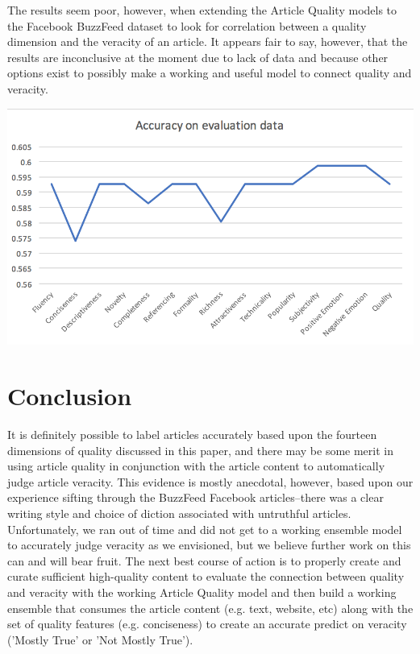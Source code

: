 \documentclass[11pt]{article}
\begin{document}
The results seem poor, however, when extending the Article Quality models to the Facebook BuzzFeed dataset to look for correlation between a quality dimension and the veracity of an article.  It appears fair to say, however, that the results are inconclusive at the moment due to lack of data and because other options exist to possibly make a working and useful model to connect quality and veracity.
\begin{center}
	\includegraphics[scale=0.5]{Results.png}
\end{center}

\section{Conclusion}

\indent \indent It is definitely possible to label articles accurately based upon the fourteen dimensions of quality discussed in this paper, and there may be some merit in using article quality in conjunction with the article content to automatically judge article veracity.  This evidence is mostly anecdotal, however, based upon our experience sifting through the BuzzFeed Facebook articles--there was a clear writing style and choice of diction associated with untruthful articles.\\
\indent Unfortunately, we ran out of time and did not get to a working ensemble model to accurately judge veracity as we envisioned, but we believe further work on this can and will bear fruit.  The next best course of action is to properly create and curate sufficient high-quality content to evaluate the connection between quality and veracity with the working Article Quality model and then build a working ensemble that consumes the article content (e.g. text, website, etc) along with the set of quality features (e.g. conciseness) to create an accurate predict on veracity ('Mostly True' or 'Not Mostly True').
\end{document}

